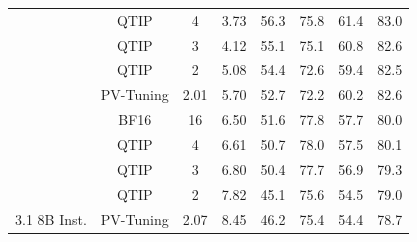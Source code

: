 \begin{table}[t]
\begin{tabular}{@{}cccccccc@{}}
\rowcolor[HTML]{D9D9D9} 
\multicolumn{1}{c|}{\cellcolor[HTML]{D9D9D9}}                                & \multicolumn{1}{c|}{\cellcolor[HTML]{D9D9D9}QTIP}      & \multicolumn{1}{c|}{\cellcolor[HTML]{D9D9D9}4}    & \multicolumn{1}{c|}{\cellcolor[HTML]{D9D9D9}3.73} & 56.3      & 75.8     & 61.4      & 83.0     \\
\rowcolor[HTML]{D9D9D9} 
\multicolumn{1}{c|}{\cellcolor[HTML]{D9D9D9}}                                & \multicolumn{1}{c|}{\cellcolor[HTML]{D9D9D9}QTIP}      & \multicolumn{1}{c|}{\cellcolor[HTML]{D9D9D9}3}    & \multicolumn{1}{c|}{\cellcolor[HTML]{D9D9D9}4.12} & 55.1      & 75.1     & 60.8      & 82.6     \\
\rowcolor[HTML]{D9D9D9} 
\multicolumn{1}{c|}{\cellcolor[HTML]{D9D9D9}}                                & \multicolumn{1}{c|}{\cellcolor[HTML]{D9D9D9}QTIP}      & \multicolumn{1}{c|}{\cellcolor[HTML]{D9D9D9}2}    & \multicolumn{1}{c|}{\cellcolor[HTML]{D9D9D9}5.08} & 54.4      & 72.6     & 59.4      & 82.5     \\
\rowcolor[HTML]{D9D9D9} 
\multicolumn{1}{c|}{\multirow{-5}{*}{\cellcolor[HTML]{D9D9D9}3.1 70B Inst.}} & \multicolumn{1}{c|}{\cellcolor[HTML]{D9D9D9}PV-Tuning} & \multicolumn{1}{c|}{\cellcolor[HTML]{D9D9D9}2.01} & \multicolumn{1}{c|}{\cellcolor[HTML]{D9D9D9}5.70} & 52.7      & 72.2     & 60.2      & 82.6     \\
\multicolumn{1}{c|}{}                                                        & \multicolumn{1}{c|}{BF16}                              & \multicolumn{1}{c|}{16}                           & \multicolumn{1}{c|}{6.50}                         & 51.6      & 77.8     & 57.7      & 80.0     \\
\multicolumn{1}{c|}{}                                                        & \multicolumn{1}{c|}{QTIP}                              & \multicolumn{1}{c|}{4}                            & \multicolumn{1}{c|}{6.61}                         & 50.7      & 78.0     & 57.5      & 80.1     \\
\multicolumn{1}{c|}{}                                                        & \multicolumn{1}{c|}{QTIP}                              & \multicolumn{1}{c|}{3}                            & \multicolumn{1}{c|}{6.80}                         & 50.4      & 77.7     & 56.9      & 79.3     \\
\multicolumn{1}{c|}{}                                                        & \multicolumn{1}{c|}{QTIP}                              & \multicolumn{1}{c|}{2}                            & \multicolumn{1}{c|}{7.82}                         & 45.1      & 75.6     & 54.5      & 79.0     \\
\multicolumn{1}{c|}{\multirow{-5}{*}{3.1 8B Inst.}}                          & \multicolumn{1}{c|}{PV-Tuning}                         & \multicolumn{1}{c|}{2.07}                         & \multicolumn{1}{c|}{8.45}                         & 46.2      & 75.4     & 54.4      & 78.7     \\ \bottomrule
\end{tabular}
\end{table}